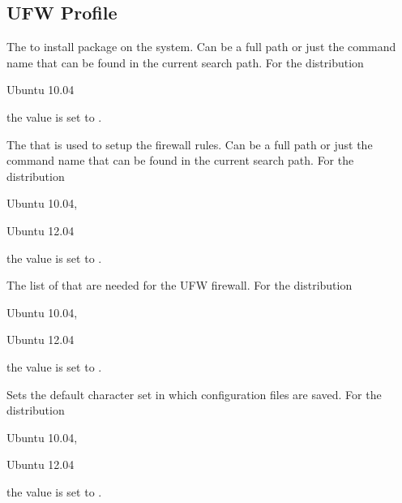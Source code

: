 \label{sec:firewall_profile}
\subsection{UFW Profile}


The  to install package on the system. Can be a full path or
just the command name that can be found in the current search path. 
For the distribution
\begin{inparaitem}
\item[\TheDistribution{ubuntu}] Ubuntu 10.04
\end{inparaitem}
the value is set to .


The  that is used to setup the firewall rules. Can be a full path or
just the command name that can be found in the current search path. 
For the distribution
\begin{inparaitem}
\item[\TheDistribution{ubuntu}] Ubuntu 10.04,
\item[\TheDistribution{ubuntu}] Ubuntu 12.04
\end{inparaitem}
the value is set to .


The list of  that are needed for the UFW firewall. 
For the distribution
\begin{inparaitem}
\item[\TheDistribution{ubuntu}] Ubuntu 10.04,
\item[\TheDistribution{ubuntu}] Ubuntu 12.04
\end{inparaitem}
the value is set to .


Sets the default character set  in which configuration files are 
saved. For the distribution
\begin{inparaitem}
\item[\TheDistribution{ubuntu}] Ubuntu 10.04,
\item[\TheDistribution{ubuntu}] Ubuntu 12.04
\end{inparaitem}
the value is set to .
